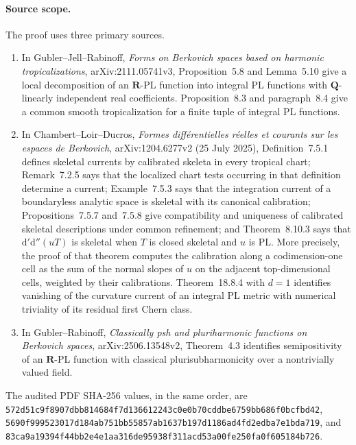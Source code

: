 
\paragraph{Source scope.}
The proof uses three primary sources.
\begin{enumerate}
\item In Gubler--Jell--Rabinoff, \emph{Forms on Berkovich spaces based on
harmonic tropicalizations}, arXiv:2111.05741v3, Proposition~5.8 and
Lemma~5.10 give a local decomposition of an $\mathbf R$-PL function into
integral PL functions with $\mathbf Q$-linearly independent real
coefficients.  Proposition~8.3 and paragraph~8.4 give a common smooth
tropicalization for a finite tuple of integral PL functions.
\item In Chambert--Loir--Ducros, \emph{Formes diff\'erentielles r\'eelles et
courants sur les espaces de Berkovich}, arXiv:1204.6277v2 (25 July 2025),
Definition~7.5.1 defines skeletal currents by calibrated skeleta in every
tropical chart; Remark~7.2.5 says that the localized chart tests occurring
in that definition determine a current; Example~7.5.3 says that the
integration current of a boundaryless analytic space is skeletal with its
canonical calibration; Propositions~7.5.7 and~7.5.8 give compatibility and
uniqueness of calibrated skeletal descriptions under common refinement;
and Theorem~8.10.3 says that $\mathrm d'\mathrm d''(uT)$ is skeletal when
$T$ is closed skeletal and $u$ is PL.  More precisely, the proof of that
theorem computes the calibration along a codimension-one cell as the sum of
the normal slopes of $u$ on the adjacent top-dimensional cells, weighted
by their calibrations.  Theorem~18.8.4 with $d=1$ identifies vanishing of
the curvature current of an integral PL metric with numerical triviality
of its residual first Chern class.
\item In Gubler--Rabinoff, \emph{Classically psh and pluriharmonic
functions on Berkovich spaces}, arXiv:2506.13548v2, Theorem~4.3 identifies
semipositivity of an $\mathbf R$-PL function with classical
plurisubharmonicity over a nontrivially valued field.
\end{enumerate}
The audited PDF SHA-256 values, in the same order, are
\texttt{572d51c9f8907dbb814684f7d136612243c0e0b70cddbe6759bb686f0bcfbd42},
\texttt{5690f999523017d184ab751bb55857ab1637b197d1186ad4fd2edba7e1bda719},
and
\texttt{83ca9a19394f44bb2e4e1aa316de95938f311acd53a00fe250fa0f605184b726}.

